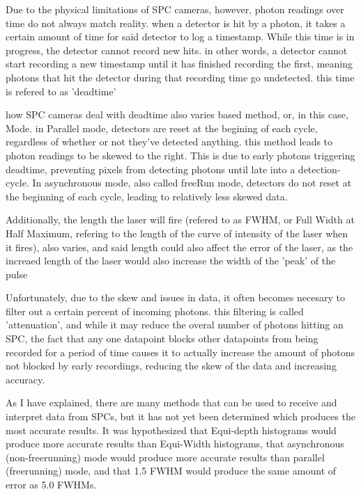 \documentclass{article}
\begin{document}
Due to the physical limitations of SPC cameras, however, photon readings over time do not always match reality. when a detector is hit by a photon, it takes a certain amount of time for said detector to log a timestamp. While this time is in progress, the detector cannot record new hits. in other words, a detector cannot start recording a new timestamp until it has finished recording the first, meaning photons that hit the detector during that recording time go undetected. this time is refered to as 'deadtime'

how SPC cameras deal with deadtime also varies based method, or, in this case, Mode. in Parallel mode, detectors are reset at the begining of each cycle, regardless of whether or not they've detected anything. this method leads to photon readings to be skewed to the right. This is due to early photons triggering deadtime, preventing pixels from detecting photons until late into a detection-cycle.  In asynchronous mode, also called freeRun mode, detectors do not reset at the beginning of each cycle, leading to relatively less skewed data.

Additionally, the length the laser will fire (refered to as FWHM, or Full Width at Half Maximum, refering to the length of the curve of intensity of the laser when it fires), also varies, and said length could also affect the error of the laser, as the increaed length of the laser would also increase the width of the 'peak' of the pulse

Unfortunately, due to the skew and issues in data, it often becomes necesary to filter out a certain percent of incoming photons. this filtering is called 'attenuation', and  while it may reduce the overal number of photons hitting an SPC, the fact that any one datapoint blocks other datapoints from being recorded for a period of time causes it to actually increase the amount of photons not blocked by early recordings, reducing the skew  of the data and increasing accuracy.

As I have explained, there are many methods that can be used to receive and interpret data from SPCs, but it has not yet been determined which produces the most accurate results. It was hypothesized that Equi-depth histograms would produce more accurate results than Equi-Width histograms, that asynchronous (non-freerunning) mode would produce more accurate results than parallel (freerunning) mode, and that 1.5 FWHM would produce the same amount of error as 5.0 FWHMs.
\end{document}
